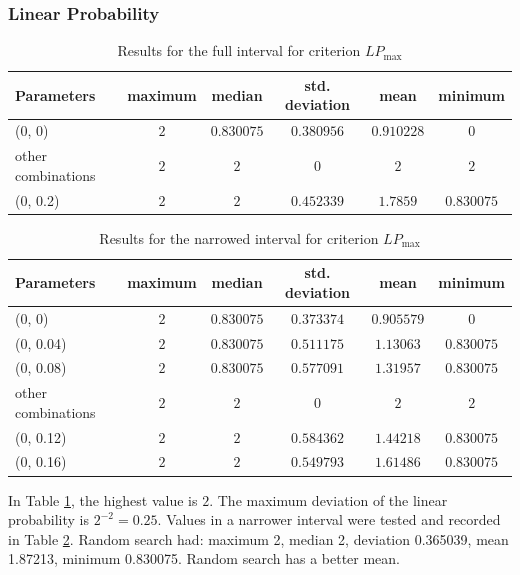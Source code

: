 \subsubsection{Linear Probability}
\begin{table}[tb]
\begin{center}
\begin{tabular}{| l | c | c | c | c | c |}
\hline
Parameters & maximum & median & std. deviation & mean & minimum \\ \hline
(0, 0) & $2$ & $0.830075$ & $0.380956$ & $0.910228$ & $0$ \\ \hline
other combinations & $2$ & $2$ & $0$ & $2$ & $2$ \\ \hline
(0, 0.2) & $2$ & $2$ & $0.452339$ & $1.7859$ & $0.830075$ \\ \hline
\end{tabular}
\caption{Results for the full interval for criterion $LP_{\max}$}
\label{tabLP_MAXParameters}
\end{center}
\end{table}
\begin{table}[tb]
\begin{center}
\begin{tabular}{| l | c | c | c | c | c |}
\hline
Parameters & maximum & median & std. deviation & mean & minimum \\ \hline
(0, 0) & $2$ & $0.830075$ & $0.373374$ & $0.905579$ & $0$ \\ \hline
(0, 0.04) & $2$ & $0.830075$ & $0.511175$ & $1.13063$ & $0.830075$ \\ \hline
(0, 0.08) & $2$ & $0.830075$ & $0.577091$ & $1.31957$ & $0.830075$ \\ \hline
other combinations & $2$ & $2$ & $0$ & $2$ & $2$ \\ \hline
(0, 0.12) & $2$ & $2$ & $0.584362$ & $1.44218$ & $0.830075$ \\ \hline
(0, 0.16) & $2$ & $2$ & $0.549793$ & $1.61486$ & $0.830075$ \\ \hline
\end{tabular}
\caption{Results for the narrowed interval for criterion $LP_{\max}$} %
\label{tabLP_MAXParametersSmall}
\end{center}
\end{table}

In Table \ref{tabLP_MAXParameters}, the highest value is $2$.
The maximum deviation of the linear probability is $2^{-2} = 0.25$.
Values in a narrower interval were tested and recorded in Table \ref{tabLP_MAXParametersSmall}.
Random search had: maximum 2, median 2, deviation 0.365039, mean 1.87213, minimum 0.830075.
Random search has a better mean.

